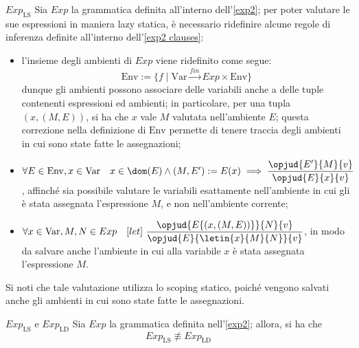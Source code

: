 \documentclass[a4paper, 12pt]{report}
\begin{document}
    \begin{framedobs}{$Exp_\mathrm{LS}$}
        Sia $Exp$ la grammatica definita all'interno dell'\cref{exp2}; per poter valutare le sue espressioni in maniera lazy statica, è necessario ridefinire alcune regole di inferenza definite all'interno dell'\cref{exp2 clauses}:

        \begin{itemize}
            \item l'insieme degli ambienti di $Exp$ viene ridefinito come segue: $$\mathrm{Env} := \{f \mid \mathrm{Var} \xrightarrow{fin} Exp \times \mathrm{Env} \}$$ dunque gli ambienti possono associare delle variabili anche a delle tuple contenenti espressioni ed ambienti; in particolare, per una tupla $(x, (M, E))$, si ha che $x$ vale $M$ valutata nell'ambiente $E$; questa correzione nella definizione di $\mathrm{Env}$ permette di tenere traccia degli ambienti in cui sono state fatte le assegnazioni;
            \item $\forall E \in \mathrm{Env}, x \in \mathrm{Var} \quad x \in \dom(E) \land (M, E') := E(x) \implies \dfrac{\opjud{E'}{M}{v}}{\opjud{E}{x}{v}}$, affinché sia possibile valutare le variabili esattamente nell'ambiente in cui gli è stata assegnata l'espressione $M$, e non nell'ambiente corrente;
            \item $\forall x \in \mathrm{Var}, M, N \in Exp \quad [let] \ \dfrac{\opjud{E\{(x, (M, E))\}}{N}{v}}{\opjud{E}{\letin{x}{M}{N}}{v}}$, in modo da salvare anche l'ambiente in cui alla variabile $x$ è stata assegnata l'espressione $M$.
        \end{itemize}

        Si noti che tale valutazione utilizza lo scoping statico, poiché vengono salvati anche gli ambienti in cui sono state fatte le assegnazioni.
    \end{framedobs}

    \begin{framedlem}{$Exp_\mathrm{LS}$ e $Exp_\mathrm{LD}$}
        Sia $Exp$ la grammatica definita nell'\cref{exp2}; allora, si ha che $$Exp_\mathrm{LS} \not\equiv Exp_\mathrm{LD}$$
    \end{framedlem}
\end{document}

